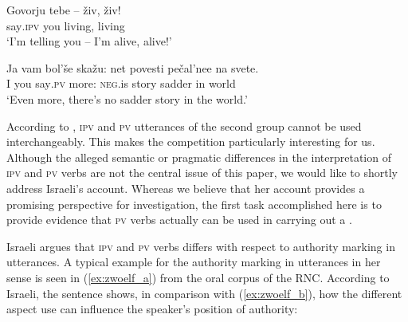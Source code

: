 \documentclass[output=paper,colorlinks,citecolor=brown,newtxmath,hidelinks]{langscibook}
\begin{document}
\ea\label{ex:zehn}
\gll  Govorju tebe -- živ, živ!\\
         say\textsc{.ipv} you {} living, living\\
\glt ‘I'm telling you -- I'm alive, alive!’
\z

\ea\label{ex:elf}
\gll Ja vam bol’še skažu: net povesti pečal’nee na svete.\\
            I   you   say\textsc{.pv}  more: \textsc{neg.}is story sadder in world\\
\glt ‘Even more, there's no sadder story in the world.’
\z

\noindent According to \citet{Israeli2001}, \textsc{ipv} and \textsc{pv}  utterances of the second group cannot be used interchangeably. This makes the  competition particularly interesting for us. Although the alleged semantic or pragmatic differences in the interpretation of \textsc{ipv} and \textsc{pv}  verbs are not the central issue of this paper, we would like to shortly address Israeli’s account. Whereas we believe that her account  provides a promising perspective for  investigation, the first task accomplished here is to provide evidence that \textsc{pv} verbs actually can be used in carrying out a .\largerpage[2]

Israeli argues that \textsc{ipv} and \textsc{pv}  verbs differs with respect to authority marking in  utterances. A typical example for the authority marking in  utterances in her sense is seen in (\ref{ex:zwoelf_a}) from the oral corpus of the RNC. According to Israeli, the sentence shows, in comparison with (\ref{ex:zwoelf_b}), how the different aspect use can influence the speaker’s position of authority:

\ea\label{ex:zwoelf} 
            \z
\z
\end{document}
